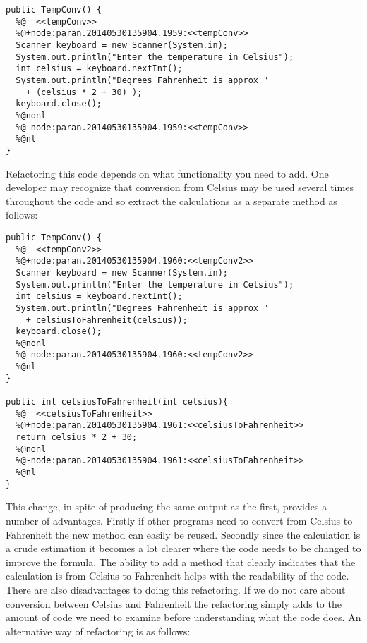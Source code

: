 \begin{minipage}[t]{1.0\textwidth}
\begin{lstlisting}
public TempConv() {
  %@  <<tempConv>>
  %@+node:paran.20140530135904.1959:<<tempConv>>
  Scanner keyboard = new Scanner(System.in);
  System.out.println("Enter the temperature in Celsius");
  int celsius = keyboard.nextInt();
  System.out.println("Degrees Fahrenheit is approx " 
    + (celsius * 2 + 30) );
  keyboard.close();
  %@nonl
  %@-node:paran.20140530135904.1959:<<tempConv>>
  %@nl
}
\end{lstlisting}
\end{minipage}


Refactoring this code depends on what functionality you need to add. 
One developer may recognize that conversion from Celsius may be used several times throughout the code and so extract the calculations as a separate method as follows:

\begin{minipage}[t]{1.0\textwidth}
\begin{lstlisting}
public TempConv() {
  %@  <<tempConv2>>
  %@+node:paran.20140530135904.1960:<<tempConv2>>
  Scanner keyboard = new Scanner(System.in);
  System.out.println("Enter the temperature in Celsius");
  int celsius = keyboard.nextInt();
  System.out.println("Degrees Fahrenheit is approx " 
    + celsiusToFahrenheit(celsius));
  keyboard.close();
  %@nonl
  %@-node:paran.20140530135904.1960:<<tempConv2>>
  %@nl
}

public int celsiusToFahrenheit(int celsius){
  %@  <<celsiusToFahrenheit>>
  %@+node:paran.20140530135904.1961:<<celsiusToFahrenheit>>
  return celsius * 2 + 30;
  %@nonl
  %@-node:paran.20140530135904.1961:<<celsiusToFahrenheit>>
  %@nl
}
\end{lstlisting}
\end{minipage}

This change, in spite of producing the same output as the first, provides a number of advantages. Firstly if other programs need to convert from Celsius to Fahrenheit the new method can easily be reused. Secondly since the calculation is a crude estimation it becomes a lot clearer where the code needs to be changed to improve the formula. The ability to add a method that clearly indicates that the calculation is from Celsius to Fahrenheit helps with the readability of the code. There are also disadvantages to doing this refactoring. If we do not care about conversion between Celsius and Fahrenheit the refactoring simply adds to the amount of code we need to examine before understanding what the code does. An alternative way of refactoring is as follows:

